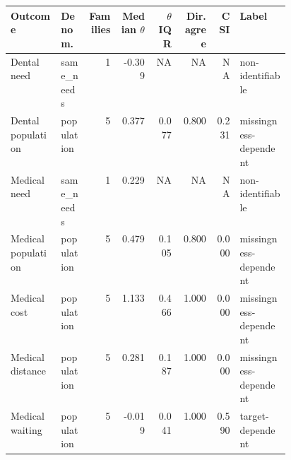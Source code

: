 \begin{tabular}{p{0.18\linewidth}p{0.10\linewidth}rrrrrp{0.18\linewidth}}
\toprule
Outcome & Denom. & Families & Median $\theta$ & $\theta$ IQR & Dir. agree & CSI & Label \\
\midrule
Dental need & same\_needs & 1 & -0.309 & NA & NA & NA & non-identifiable \\
Dental population & population & 5 & 0.377 & 0.077 & 0.800 & 0.231 & missingness-dependent \\
Medical need & same\_needs & 1 & 0.229 & NA & NA & NA & non-identifiable \\
Medical population & population & 5 & 0.479 & 0.105 & 0.800 & 0.000 & missingness-dependent \\
Medical cost & population & 5 & 1.133 & 0.466 & 1.000 & 0.000 & missingness-dependent \\
Medical distance & population & 5 & 0.281 & 0.187 & 1.000 & 0.000 & missingness-dependent \\
Medical waiting & population & 5 & -0.019 & 0.041 & 1.000 & 0.590 & target-dependent \\
\bottomrule
\end{tabular}
